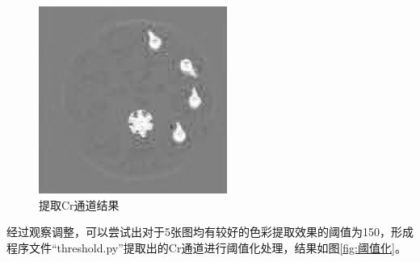 \documentclass[a4paper]{ctexart}
\begin{document}
\begin{figure}[htbp]
\begin{minipage}[t]{0.25\textwidth}
		\includegraphics[width=\textwidth]{figure/R_channel/img5.jpg}
	\end{minipage}
	\caption{提取Cr通道结果}\label{fig:Cr通道}
\end{figure}

经过观察调整，可以尝试出对于5张图均有较好的色彩提取效果的阈值为150，形成程序文件“threshold.py”提取出的Cr通道进行阈值化处理，结果如图\ref{fig:阈值化}。
\end{document}
